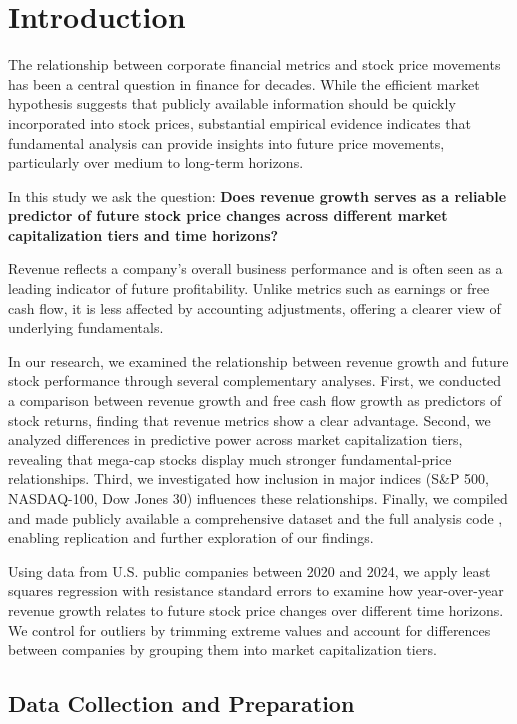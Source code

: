 \documentclass[11pt]{article}
\begin{document}
\section{Introduction}

The relationship between corporate financial metrics and stock price movements has been a central question in finance for decades. While the efficient market hypothesis suggests that publicly available information should be quickly incorporated into stock prices, substantial empirical evidence indicates that fundamental analysis can provide insights into future price movements, particularly over medium to long-term horizons.

In this study we ask the question: \textbf{Does revenue growth serves as a reliable predictor of future stock price changes across different market capitalization tiers and time horizons?}

Revenue reflects a company's overall business performance and is often seen as a leading indicator of future profitability. Unlike metrics such as earnings or free cash flow, it is less affected by accounting adjustments, offering a clearer view of underlying fundamentals.

In our research, we examined the relationship between revenue growth and future stock performance through several complementary analyses. First, we conducted a comparison between revenue growth and free cash flow growth as predictors of stock returns, finding that revenue metrics show a clear advantage. Second, we analyzed differences in predictive power across market capitalization tiers, revealing that mega-cap stocks display much stronger fundamental-price relationships. Third, we investigated how inclusion in major indices (S\&P 500, NASDAQ-100, Dow Jones 30) influences these relationships. Finally, we compiled and made publicly available a comprehensive dataset \citep{cash-time-machine-dataset} and the full analysis code \citep{cash-time-machine-code}, enabling replication and further exploration of our findings.

Using data from U.S. public companies between 2020 and 2024, we apply least squares regression with resistance standard errors to examine how year-over-year revenue growth relates to future stock price changes over different time horizons. We control for outliers by trimming extreme values and account for differences between companies by grouping them into market capitalization tiers.

\subsection{Data Collection and Preparation}
\end{document}
